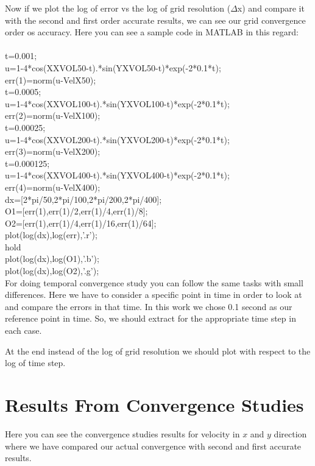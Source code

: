 \documentclass[10pt] {article}
\begin{document}
Now if we plot the log of error vs the log of grid resolution ($\Delta$x) and compare it with the second and first order accurate results, we can see our grid convergence order os accuracy. Here you can see a sample code in MATLAB in this regard:\\
\\
t=0.001;\\
u=1-4*cos(XXVOL50-t).*sin(YXVOL50-t)*exp(-2*0.1*t);\\
err(1)=norm(u-VelX50);\\
t=0.0005;\\
u=1-4*cos(XXVOL100-t).*sin(YXVOL100-t)*exp(-2*0.1*t);\\
err(2)=norm(u-VelX100);\\
t=0.00025;\\
u=1-4*cos(XXVOL200-t).*sin(YXVOL200-t)*exp(-2*0.1*t);\\
err(3)=norm(u-VelX200);\\
t=0.000125;\\
u=1-4*cos(XXVOL400-t).*sin(YXVOL400-t)*exp(-2*0.1*t);\\
err(4)=norm(u-VelX400);\\
dx=[2*pi/50,2*pi/100,2*pi/200,2*pi/400];\\
O1=[err(1),err(1)/2,err(1)/4,err(1)/8];\\
O2=[err(1),err(1)/4,err(1)/16,err(1)/64];\\
plot(log(dx),log(err),'.r');\\
hold\\
plot(log(dx),log(O1),'.b');\\
plot(log(dx),log(O2),'.g');\\

For doing temporal convergence study you can follow the same tasks with small differences. Here we have to consider a specific point in time in order to look at and compare the errors in that time. In this work we chose 0.1 second as our reference point in time. So, we should extract for the appropriate time step in each case. 

At the end instead of the log of grid resolution we should plot with respect to the log of time step.

\section{Results From Convergence Studies} 
Here you can see the convergence studies results for velocity in $x$ and $y$ direction where we have compared our actual convergence with second and first accurate results.
\end{document}
